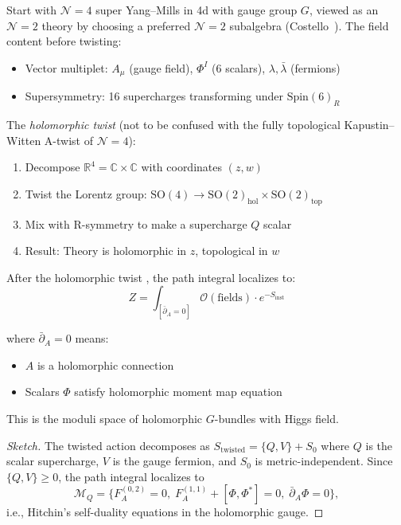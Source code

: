 \begin{definition}[Holomorphic twist of 4d \texorpdfstring{$\mathcal{N}=4$}{N=4} SYM]
Start with $\mathcal{N}=4$ super Yang--Mills in 4d with gauge group $G$, viewed as an $\mathcal{N}=2$ theory by choosing a preferred $\mathcal{N}=2$ subalgebra (Costello~\cite{costello-renormalization}). The field content before twisting:
\begin{itemize}
\item Vector multiplet: $A_\mu$ (gauge field), $\Phi^I$ (6 scalars), $\lambda,
\bar{\lambda}$ (fermions)
\item Supersymmetry: 16 supercharges transforming under $\text{Spin}(6)_R$
\end{itemize}

The \emph{holomorphic twist} (not to be confused with the fully topological Kapustin--Witten A-twist of $\mathcal{N}=4$):
\begin{enumerate}
\item Decompose $\mathbb{R}^4 = \mathbb{C} \times \mathbb{C}$ with coordinates
$(z, w)$
\item Twist the Lorentz group: $\text{SO}(4) \to \text{SO}(2)_{\text{hol}} \times
\text{SO}(2)_{\text{top}}$
\item Mix with R-symmetry to make a supercharge $Q$ scalar
\item Result: Theory is holomorphic in $z$, topological in $w$
\end{enumerate}
\end{definition}

\begin{theorem}\label{thm:ht-localization}
After the holomorphic twist \cite{costello-renormalization}, the path integral localizes to:
\[Z = \int_{[\bar{\partial}_A = 0]} \mathcal{O}(\text{fields}) \cdot e^{-S_{\text{inst}}}\]

where $\bar{\partial}_A = 0$ means:
\begin{itemize}
\item $A$ is a holomorphic connection
\item Scalars $\Phi$ satisfy holomorphic moment map equation
\end{itemize}

This is the moduli space of holomorphic $G$-bundles with Higgs field.
\end{theorem}

\begin{proof}[Sketch]
The twisted action decomposes as $S_{\mathrm{twisted}} = \{Q, V\} + S_0$ where $Q$ is the scalar supercharge, $V$ is the gauge fermion, and $S_0$ is metric-independent. Since $\{Q, V\} \geq 0$, the path integral localizes to
\[\mathcal{M}_Q = \{F_{A}^{(0,2)} = 0,\; F_A^{(1,1)} + [\Phi, \Phi^*] = 0,\; \bar{\partial}_A \Phi = 0\},\]
i.e., Hitchin's self-duality equations in the holomorphic gauge.
\end{proof}

